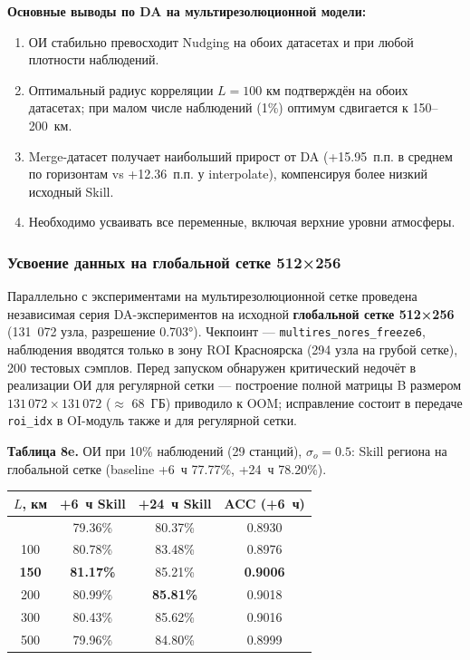 \documentclass[14pt,a4paper]{extarticle}
\newcounter{none}
\numberwithin{table}{section}
\numberwithin{figure}{section}
\numberwithin{equation}{section}
\providecommand{\tightlist}{%
  \setlength{\itemsep}{0pt}\setlength{\parskip}{0pt}}
\begin{document}
\textbf{Основные выводы по DA на мультирезолюционной модели:}
\begin{enumerate}
\def\labelenumi{\arabic{enumi}.}
\tightlist
\item ОИ стабильно превосходит Nudging на обоих датасетах и при любой
  плотности наблюдений.
\item Оптимальный радиус корреляции \(L = 100\) км подтверждён на обоих
  датасетах; при малом числе наблюдений (1\%) оптимум сдвигается к
  150--200~км.
\item Merge-датасет получает наибольший прирост от DA (+15.95~п.п. в среднем
  по горизонтам vs +12.36~п.п. у interpolate), компенсируя более низкий
  исходный Skill.
\item Необходимо усваивать все переменные, включая верхние уровни
  атмосферы.
\end{enumerate}

\subsubsection{Усвоение данных на глобальной сетке 512×256}\label{ux443ux441ux432ux43eux435ux43dux438ux435-ux43dux430-ux433ux43bux43eux431ux430ux43bux44cux43dux43eux439-ux441ux435ux442ux43aux435}

Параллельно с экспериментами на мультирезолюционной сетке проведена
независимая серия DA-экспериментов на исходной \textbf{глобальной
сетке 512×256} (131~072 узла, разрешение 0.703°). Чекпоинт ---
\texttt{multires\_nores\_freeze6}, наблюдения вводятся только в зону
ROI Красноярска (294 узла на грубой сетке), 200 тестовых сэмплов.
Перед запуском обнаружен критический недочёт в реализации ОИ для
регулярной сетки --- построение полной матрицы B размером
\(131\,072 \times 131\,072\) (\(\approx\) 68~ГБ) приводило к OOM;
исправление состоит в передаче \texttt{roi\_idx} в OI-модуль также и
для регулярной сетки.

\textbf{Таблица 8e.} ОИ при 10\% наблюдений (29 станций),
\(\sigma_o = 0.5\): Skill региона на глобальной сетке (baseline +6~ч
77.77\%, +24~ч 78.20\%).

{\def\LTcaptype{none}
\begin{longtable}[]{@{}cccc@{}}
\toprule\noalign{}
$L$, км & +6~ч Skill & +24~ч Skill & ACC (+6~ч) \\
\midrule\noalign{}
\endhead
\bottomrule\noalign{}
\endlastfoot
50  & 79.36\% & 80.37\% & 0.8930 \\
100 & 80.78\% & 83.48\% & 0.8976 \\
\textbf{150} & \textbf{81.17\%} & 85.21\% & \textbf{0.9006} \\
200 & 80.99\% & \textbf{85.81\%} & 0.9018 \\
300 & 80.43\% & 85.62\% & 0.9016 \\
500 & 79.96\% & 84.80\% & 0.8999 \\
\end{longtable}
}
\end{document}
